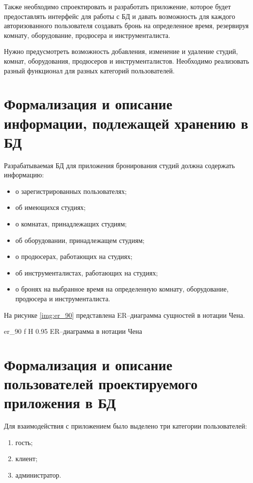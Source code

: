 Также необходимо спроектировать и разработать приложение, которое будет предоставлять интерфейс для работы с БД и давать возможность для каждого авторизованного пользователя создавать бронь на определенное время, резервируя комнату, оборудование, продюсера и инструменталиста.

Нужно предусмотреть возможность добавления, изменение и удаление студий, комнат, оборудования, продюсеров и инструменталистов.
Необходимо реализовать разный функционал для разных категорий пользователей.

\section{Формализация и описание информации, подлежащей хранению в БД}
Разрабатываемая БД для приложения бронирования студий должна содержать информацию:
\begin{itemize}
	\item о зарегистрированных пользователях;
	\item об имеющихся студиях;
	\item о комнатах, принадлежащих студиям;
	\item об оборудовании, принадлежащем студиям;
	\item о продюсерах, работающих на студиях;
	\item об инструменталистах, работающих на студиях;
	\item о бронях на выбранное время на определенную комнату, оборудование, продюсера и инструменталиста.
\end{itemize}

На рисунке \ref{img:er_90} представлена ER--диаграмма сущностей в нотации Чена.


{er_90} %
{f} %
{H} %
{0.95\textwidth} %
{ER--диаграмма в нотации Чена} %



\section{Формализация и описание пользователей проектируемого приложения в БД}
Для взаимодействия с приложением было выделено три категории пользователей:
\begin{enumerate}
	\item гость;
	\item клиент;
	\item администратор.
\end{enumerate}

